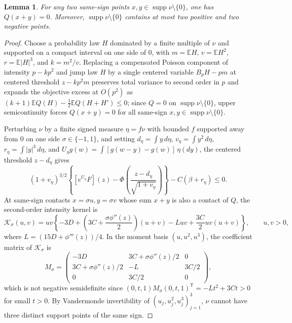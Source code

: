 \documentclass[11pt]{article}
\numberwithin{equation}{section}
\newtheorem{lemma}[theorem]{Lemma}
\theoremstyle{definition}
\DeclareMathOperator{\supp}{supp}
\newcommand{\E}{\mathbb E}
\begin{document}
\begin{lemma}\label{lem:levy-pairs}
For any two same-sign points $x,y\in\supp\nu\setminus\{0\}$, one has
$Q(x+y)=0$. Moreover, $\supp\nu\setminus\{0\}$ contains at most two positive
and two negative points.
\end{lemma}
\begin{proof}
Choose a probability law $H$ dominated by a finite multiple of $\nu$ and
supported on a compact interval on one side of $0$, with $m=\E H$,
$v=\E H^2$, $r=\E|H|^3$, and $k=m^2/v$. Replacing a compensated Poisson
component of intensity $p-kp^2$ and jump law $H$ by a single centered variable
$B_pH-pm$ at centered threshold $z-kp^2m$ preserves total variance to second
order in $p$ and expands the objective excess at $O(p^2)$ as
$(k+1)\E Q(H)-\frac12\E Q(H+H')\le0$; since $Q=0$ on $\supp\nu\setminus\{0\}$,
upper semicontinuity forces $Q(x+y)=0$ for all same-sign
$x,y\in\supp\nu\setminus\{0\}$.

Perturbing $\nu$ by a finite signed measure $\eta=f\nu$ with bounded $f$
supported away from $0$ on one side $\sigma\in\{-1,1\}$, and setting
$d_\eta=\int y\,d\eta$, $v_\eta=\int y^2\,d\eta$, $r_\eta=\int|y|^3\,d\eta$,
and $U_\eta g(w)=\int[g(w-y)-g(w)]\,\eta(dy)$, the centered threshold
$z-d_\eta$ gives
\begin{equation}\label{eq:intensity-objective}
 (1+v_\eta)^{3/2}
 \left\{[e^{U_\eta}F](z)
       -\Phi\!\left(\frac{z-d_\eta}{\sqrt{1+v_\eta}}\right)\right\}
        -C(\beta+r_\eta)\le0.
\end{equation}
At same-sign contacts $x=\sigma u,y=\sigma v$ whose sum $x+y$ is also a
contact of $Q$, the second-order intensity kernel is
\begin{equation}\label{eq:kernel}
 \mathcal K_\sigma(u,v)=uv\left\{-3D+
       \left(3C+\frac{\sigma\phi''(z)}2\right)(u+v)
       -Luv+\frac{3C}{2}uv(u+v)\right\},\qquad u,v>0,
\end{equation}
where $L=(15D+\phi'''(z))/4$. In the moment basis $(u,u^2,u^3)$, the
coefficient matrix of $\mathcal K_\sigma$ is
\begin{equation}\label{eq:moment-matrix}
 M_\sigma=
 \begin{pmatrix}
 -3D&3C+\sigma\phi''(z)/2&0\\
 3C+\sigma\phi''(z)/2&-L&3C/2\\
 0&3C/2&0
 \end{pmatrix},
\end{equation}
which is not negative semidefinite since $(0,t,1)M_\sigma(0,t,1)^{\mathsf T}=-Lt^2+3Ct>0$
for small $t>0$. By Vandermonde invertibility of $(u_j,u_j^2,u_j^3)_{j=1}^3$,
$\nu$ cannot have three distinct support points of the same sign.
\end{proof}
\end{document}
